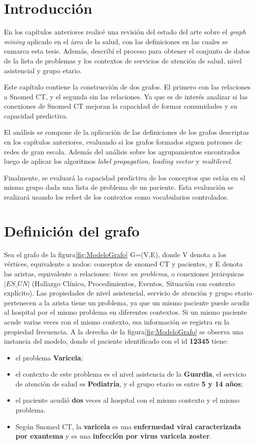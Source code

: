 \section{Introducción}
En los capítulos anteriores realicé una revisión del estado del arte sobre el \textit{graph mining} aplicado en el área de la salud, con las definiciones en las cuales se enmarca esta tesis. Además, describí el proceso para obtener el conjunto de datos de la lista de problemas y los contextos de servicios de atención de salud, nivel asistencial y grupo etario. 

Este capítulo contiene la construcción de dos grafos. El primero con las relaciones a Snomed CT, y el segunda sin las relaciones. Ya que es de interés analizar si las conexiones de Snomed CT mejoran la capacidad de formar comunidades y su capacidad predictiva.

El análisis se compone de la aplicación de las definiciones de los grafos descriptas en los capítulos anteriores, evaluando si los grafos formados siguen patrones de redes de gran escala. Además del análisis sobre los agrupamientos encontrados luego de aplicar los algoritmos \textit{label propagation}, \textit{leading vector} y \textit{multilevel}. 

Finalmente, se evaluará la capacidad predictiva de los conceptos que están en el mismo grupo dada una lista de problema de un paciente. Esta evaluación se realizará usando los {\acrshort{refset}} de los contextos como vocabularios controlados.

\section{Definición del grafo}
Sea el grafo de la figura\ref{fig:ModeloGrafo} G=(V,E), donde V denota a los vértices, equivalente a nodos: conceptos de snomed CT y pacientes, y E denota las aristas, equivalente a relaciones: \textit{tiene un problema}, o conexiones jerárquicas $|\textit{ES\_UN}|$  (Hallazgo Clínico, Procedimientos, Eventos, Situación con contexto explícito). Las propiedades de nivel asistencial, servicio de atención  y grupo etario pertenecen a la arista {tiene un problema}, ya que un mismo paciente puede acudir al hospital por el mismo problema en diferentes contextos.  Si un mismo paciente acude varias veces con el mismo contexto, esa información se registra en la propiedad frecuencia. A la derecha de la figura\ref{fig:ModeloGrafo} se observa una instancia del modelo, donde el paciente identificado con el id \textbf{12345} tiene:
\begin{itemize}
\item el problema \textbf{Varicela}; 
\item el contexto de este problema es el nivel asistencia de la \textbf{Guardia}, el servicio de atención de salud es \textbf{Pediatría}, y el grupo etario es entre \textbf{5 y 14 años}; 
\item el paciente acudió \textbf{dos} veces al hospital con el mismo contexto y el mismo problema.
\item Según Snomed CT, la \textbf{varicela} es una \textbf{enfermedad viral caracterizada por exantema} y es una \textbf{infección por virus varicela zoster}.
\end{itemize}


